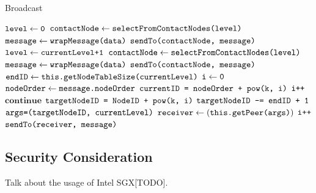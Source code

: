 \begin{algorithm}[t]
	\caption{Broadcast}\label{euclid}
	\begin{algorithmic}[1]
		\State $\texttt{level} \gets \texttt{0}$
		\State $\texttt{contactNode} \gets \texttt{selectFromContactNodes(level)}$
		\State $\texttt{message} \gets \texttt{wrapMessage(data)}$
		\State $\texttt{sendTo(contactNode, message)}$
		\EndFunction
		\\
		\State $\texttt{level} \gets \texttt{currentLevel+1}$
		\State $\texttt{contactNode} \gets \texttt{selectFromContactNodes(level)}$
		\State $\texttt{message} \gets \texttt{wrapMessage(data)}$
		\State $\texttt{sendTo(contactNode, message)}$
		\EndFunction
		\\
		\State $\texttt{endID} \gets \texttt{this.getNodeTableSize(currentLevel)}$
		\State $\texttt{i} \gets \texttt{0}$
		\State $\texttt{nodeOrder} \gets \texttt{message.nodeOrder}$
		\State $\texttt{currentID = nodeOrder + pow(k, i)}$
			\State $\texttt{i++}$
			\State $\textbf{continue}$
			\Else
			\State $\texttt{targetNodeID = NodeID + pow(k, i)}$
			\State $\texttt{targetNodeID -= endID + 1}$
			\EndIf
			\State $\texttt{args=(targetNodeID, currentLevel)}$
			\State $\texttt{receiver} \gets (\texttt{this.getPeer(args)})$
			\State $\texttt{i++}$
			\State $\texttt{sendTo(receiver, message)}$
			\EndIf
		\EndWhile
		\EndFunction
	\end{algorithmic}
\end{algorithm}

\subsection{Security Consideration} \label{security}

Talk about the usage of Intel SGX[TODO].


